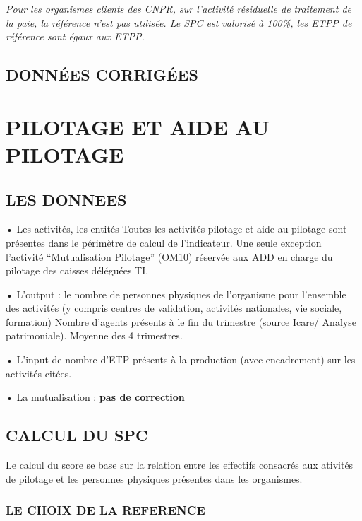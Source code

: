 \documentclass[
]{book}
\begin{document}
\emph{Pour les organismes clients des CNPR, sur l'activité résiduelle de traitement de la paie, la référence n'est pas utilisée. Le SPC est valorisé à 100\%, les ETPP de référence sont égaux aux ETPP.}

\hypertarget{donnuxe9es-corriguxe9es-5}{%
\section{DONNÉES CORRIGÉES}\label{donnuxe9es-corriguxe9es-5}}

\hypertarget{pilotage-et-aide-au-pilotage}{%
\chapter{PILOTAGE ET AIDE AU PILOTAGE}\label{pilotage-et-aide-au-pilotage}}

\hypertarget{les-donnees-17}{%
\section{LES DONNEES}\label{les-donnees-17}}

• Les activités, les entités
Toutes les activités pilotage et aide au pilotage sont présentes dans le périmètre de calcul de l'indicateur.
Une seule exception l'activité ``Mutualisation Pilotage'' (OM10) réservée aux ADD en charge du pilotage des
caisses déléguées TI.

• L'output : le nombre de personnes physiques de l'organisme pour l'ensemble des activités (y compris
centres de validation, activités nationales, vie sociale, formation) Nombre d'agents présents à le fin du
trimestre (source Icare/ Analyse patrimoniale). Moyenne des 4 trimestres.

• L'input de nombre d'ETP présents à la production (avec encadrement) sur les activités citées.

• La mutualisation : \textbf{pas de correction}

\hypertarget{calcul-du-spc}{%
\section{CALCUL DU SPC}\label{calcul-du-spc}}

Le calcul du score se base sur la relation entre les effectifs consacrés aux ativités de pilotage et les personnes physiques présentes dans les organismes.

\hypertarget{le-choix-de-la-reference-8}{%
\subsection{LE CHOIX DE LA REFERENCE}\label{le-choix-de-la-reference-8}}
\end{document}
